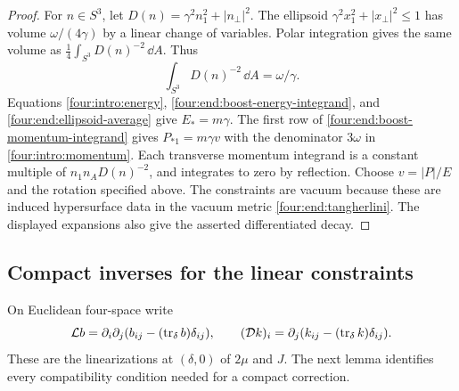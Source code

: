 \begin{proof}
For \(n\in S^3\), let
\(D(n)=\gamma^2 n_1^2+|n_\perp|^2\). The ellipsoid
\(\gamma^2x_1^2+|x_\perp|^2\le1\) has volume
\(\omega/(4\gamma)\) by a linear change of variables. Polar integration
gives the same volume as \(\frac14\int_{S^3}D(n)^{-2}\,\dd A\).
Thus
\begin{equation}\label{four:end:ellipsoid-average}
 \int_{S^3}D(n)^{-2}\,\dd A=\omega/\gamma.
\end{equation}
Equations \eqref{four:intro:energy}, \eqref{four:end:boost-energy-integrand}, and
\eqref{four:end:ellipsoid-average} give \(E_*=m\gamma\).
The first row of \eqref{four:end:boost-momentum-integrand} gives
\(P_{*1}=m\gamma v\) with the denominator \(3\omega\) in
\eqref{four:intro:momentum}. Each transverse momentum integrand is a constant
multiple of \(n_1n_A D(n)^{-2}\), and integrates to zero by reflection.
Choose \(v=|P|/E\) and the rotation specified above.
The constraints are vacuum because these are induced hypersurface data
in the vacuum metric \eqref{four:end:tangherlini}. The displayed expansions
also give the asserted differentiated decay.
\end{proof}

\subsection{Compact inverses for the linear constraints}

On Euclidean four-space write
\begin{equation}\label{four:end:linear-operators}
 \mathcal L b=\partial_i\partial_j
                  (b_{ij}-(\operatorname{tr}_\delta b)\delta_{ij}),\qquad
 (\mathcal D k)_i=\partial_j
                  (k_{ij}-(\operatorname{tr}_\delta k)\delta_{ij}).
\end{equation}
These are the linearizations at \((\delta,0)\) of \(2\mu\) and \(J\).
The next lemma identifies every compatibility condition needed for a
compact correction.

